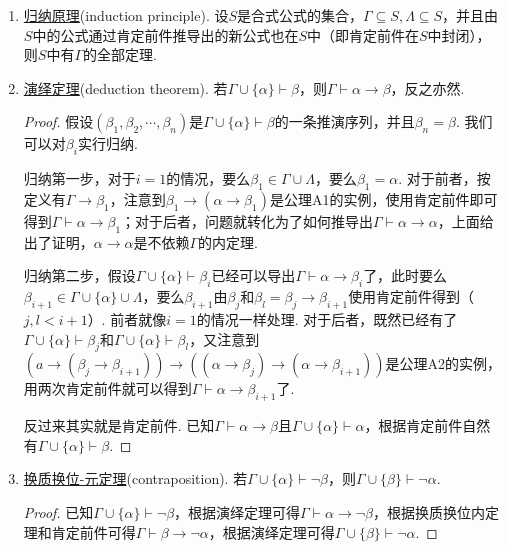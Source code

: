 \begin{enumerate}
    \item \underline{归纳原理}(induction principle). 设$ S $是合式公式的集合，$ \Gamma \subseteq S, \Lambda \subseteq S $，并且由$ S $中的公式通过肯定前件推导出的新公式也在$ S $中（即肯定前件在$ S $中封闭），则$ S $中有$ \Gamma $的全部定理.

    \item \underline{演绎定理}(deduction theorem). 若$ \Gamma \cup \{\alpha\} \vdash \beta $，则$\Gamma \vdash \alpha \to \beta $，反之亦然.
    \begin{proof}
        假设$(\beta_1,\beta_2,\cdots,\beta_n)$是$\Gamma \cup \{\alpha\} \vdash \beta$的一条推演序列，并且$\beta_n = \beta$. 我们可以对$\beta_i$实行归纳.
        
        归纳第一步，对于$i=1$的情况，要么$\beta_1 \in \Gamma \cup \Lambda$，要么$\beta_1 = \alpha$. 对于前者，按定义有$\Gamma \to \beta_1$，注意到$\beta_1 \to (\alpha \to \beta_1)$是公理A1的实例，使用肯定前件即可得到$\Gamma \vdash \alpha \to \beta_1$；对于后者，问题就转化为了如何推导出$\Gamma \vdash \alpha \to \alpha$，上面给出了证明，$\alpha \to \alpha$是不依赖$\Gamma$的内定理.
        
        归纳第二步，假设$\Gamma \cup \{\alpha\} \vdash \beta_i$已经可以导出$\Gamma \vdash \alpha \to \beta_i$了，此时要么$\beta_{i+1} \in \Gamma \cup \{\alpha\} \cup \Lambda$，要么$\beta_{i+1}$由$\beta_j$和$\beta_l = \beta_j \to \beta_{i+1}$使用肯定前件得到（$j,l < i+1$）. 前者就像$i=1$的情况一样处理. 对于后者，既然已经有了$\Gamma \cup \{\alpha\} \vdash \beta_j$和$\Gamma \cup \{\alpha\} \vdash \beta_l$，又注意到$(a \to (\beta_j \to \beta_{i+1})) \to ((\alpha \to \beta_j) \to (\alpha \to \beta_{i+1}))$是公理A2的实例，用两次肯定前件就可以得到$\Gamma \vdash \alpha \to \beta_{i+1}$了.

        反过来其实就是肯定前件. 已知$\Gamma \vdash \alpha \to \beta$且$\Gamma \cup \{\alpha\} \vdash \alpha$，根据肯定前件自然有$\Gamma \cup \{\alpha\} \vdash \beta$.
    \end{proof}

    \item \underline{换质换位-元定理}(contraposition). 若$\Gamma \cup \{\alpha\} \vdash \neg \beta$，则$\Gamma \cup \{\beta\} \vdash \neg \alpha$.
    \begin{proof}
        已知$\Gamma \cup \{\alpha\} \vdash \neg \beta$，根据演绎定理可得$\Gamma \vdash \alpha \to \neg \beta$，根据换质换位内定理和肯定前件可得$\Gamma \vdash \beta \to \neg \alpha$，根据演绎定理可得$\Gamma \cup \{\beta\} \vdash \neg \alpha$.
    \end{proof}


\end{enumerate}

